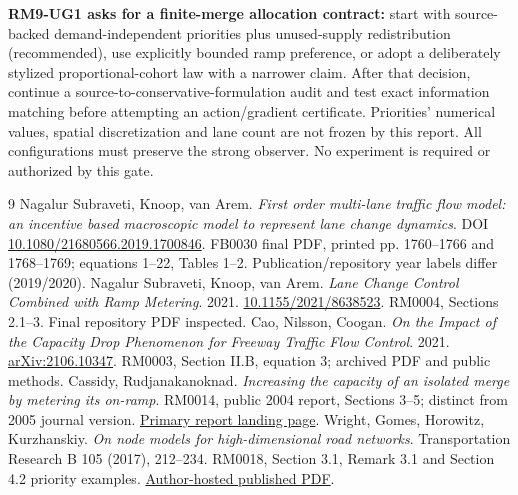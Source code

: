 \documentclass[10pt,a4paper]{article}
\begin{document}
\textbf{RM9-UG1 asks for a finite-merge allocation contract:} start with
source-backed demand-independent priorities plus unused-supply redistribution
(recommended), use explicitly bounded ramp preference, or adopt a deliberately
stylized proportional-cohort law with a narrower claim. After that decision,
continue a source-to-conservative-formulation audit and test exact information
matching before attempting an action/gradient certificate. Priorities' numerical
values, spatial discretization and lane count are not frozen by this report.
All configurations must preserve the strong observer. No experiment is required
or authorized by this gate.

\begin{thebibliography}{9}
 Nagalur Subraveti, Knoop, van Arem.
\emph{First order multi-lane traffic flow model: an incentive based macroscopic
model to represent lane change dynamics}. DOI
\href{https://doi.org/10.1080/21680566.2019.1700846}{10.1080/21680566.2019.1700846}.
FB0030 final PDF, printed pp. 1760--1766 and 1768--1769; equations 1--22,
Tables 1--2. Publication/repository year labels differ (2019/2020).
 Nagalur Subraveti, Knoop, van Arem.
\emph{Lane Change Control Combined with Ramp Metering}. 2021.
\href{https://doi.org/10.1155/2021/8638523}{10.1155/2021/8638523}.
RM0004, Sections 2.1--3. Final repository PDF inspected.
 Cao, Nilsson, Coogan.
\emph{On the Impact of the Capacity Drop Phenomenon for Freeway Traffic Flow
Control}. 2021. \href{https://arxiv.org/abs/2106.10347}{arXiv:2106.10347}.
RM0003, Section II.B, equation 3; archived PDF and public methods.
 Cassidy, Rudjanakanoknad.
\emph{Increasing the capacity of an isolated merge by metering its on-ramp}.
RM0014, public 2004 report, Sections 3--5; distinct from 2005 journal version.
\href{https://escholarship.org/uc/item/30s46939}{Primary report landing page}.
 Wright, Gomes, Horowitz, Kurzhanskiy.
\emph{On node models for high-dimensional road networks}.
Transportation Research B 105 (2017), 212--234.
RM0018, Section 3.1, Remark 3.1 and Section 4.2 priority examples.
\href{https://horowitz.me.berkeley.edu/Publications_files/All_papers_numbered/Wright_node_models_transportation_networks_Transportation_research_B_2017.pdf}{Author-hosted published PDF}.
\end{thebibliography}
\end{document}
